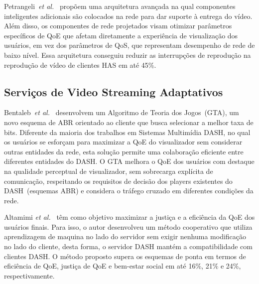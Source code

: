 
Petrangeli~\textit{et al.}~\cite{petrangeli2019IM}
propõem uma arquitetura avançada na qual componentes inteligentes adicionais são colocados na rede para dar suporte à entrega do vídeo. Além disso, os componentes de rede projetados visam otimizar parâmetros específicos de QoE que afetam diretamente a experiência de visualização dos usuários, em vez dos parâmetros de QoS, que representam desempenho de rede de baixo nível.
Essa arquitetura conseguiu reduzir as interrupções de reprodução na reprodução de vídeo de clientes HAS em até 45\%.


\subsection{Serviços de Video Streaming Adaptativos}

Bentaleb~\textit{et al.}~\cite{bentaleb:2018:MSys} desenvolvem um Algoritmo de Teoria dos Jogos~(GTA), um novo esquema de ABR orientado ao cliente que busca selecionar a melhor taxa de bits.
Diferente da maioria dos trabalhos em Sistemas Multimídia DASH, no qual os usuários se esforçam para maximizar a QoE do visualizador sem considerar outras entidades da rede, esta solução permite uma colaboração eficiente entre diferentes entidades do DASH. 
O GTA melhora o QoE dos usuários com destaque na qualidade perceptual de visualizador, sem sobrecarga explícita de comunicação, respeitando os requisitos de decisão dos players existentes do DASH~(esquemas ABR) e considera o tráfego cruzado em diferentes condições da rede. 

Altamimi \textit{et al.}~\cite{Altamimi:2019:CCF}
têm como objetivo maximizar a justiça e a eficiência da QoE dos usuários finais. Para isso, o autor desenvolveu um método cooperativo que utiliza aprendizagem de maquina no lado do servidor sem exigir nenhuma modificação no lado do cliente, desta forma, o servidor DASH mantém a compatibilidade com clientes DASH. O método proposto supera os esquemas de ponta em termos de eficiência de QoE, justiça de QoE e bem-estar social em até 16\%, 21\% e 24\%, respectivamente.

